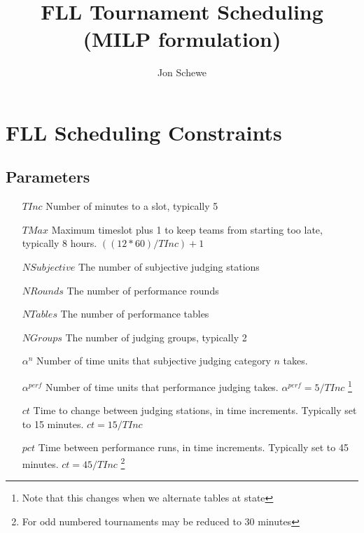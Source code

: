 \documentclass[letterpaper,11pt]{report}
\title{FLL Tournament Scheduling (MILP formulation)}
\author{Jon Schewe}
\newcommand{\doccomment}[3]%
{\marginpar{\textcolor{#2}{\bf #1}}%
\footnote{{\color{#2}#3}}%
}
\newcommand{\doccomment}[3]{}
\newcommand{\jpscomment}[1]%
{\doccomment{SCHEWE}{Bittersweet}{#1}}
\begin{document}
\maketitle

\chapter{FLL Scheduling Constraints}

\section{Parameters}
\begin{itemize}

\item[$TInc$] Number of minutes to a slot, typically 5
\item[$TMax$] Maximum timeslot plus 1 to keep teams from starting too late, typically 8 hours. $((12 * 60)/TInc) + 1$
\item[$NSubjective$] The number of subjective judging stations
\item[$NRounds$] The number of performance rounds
\item[$NTables$] The number of performance tables
\item[$NGroups$] The number of judging groups, typically 2

\item[$\alpha^{n}$] Number of time units that subjective judging
  category $n$ takes.

\item[$\alpha^{perf}$] Number of time units that performance judging
  takes. $\alpha^{perf} = 5 / TInc$ \jpscomment{Note that this
changes when we alternate tables at state}

\item[$ct$] Time to change between judging stations, in time increments. Typically set to 15
  minutes. $ct = 15/TInc$
\item[$pct$] Time between performance runs, in time increments. Typically set to 45
  minutes. $ct = 45/TInc$ \jpscomment{For odd numbered tournaments may be reduced to 30
    minutes}

\end{itemize}
\end{document}
